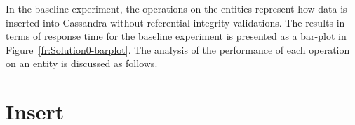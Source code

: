 In the baseline experiment, the operations on the entities represent how
data is inserted into Cassandra without referential integrity validations. The
results in terms of response time for the baseline experiment is presented as
a bar-plot in Figure~\ref{fr:Solution0-barplot}. The analysis of
the performance of each operation on an entity is discussed as follows.






 
\clearpage





\newpage
\section{Insert}

